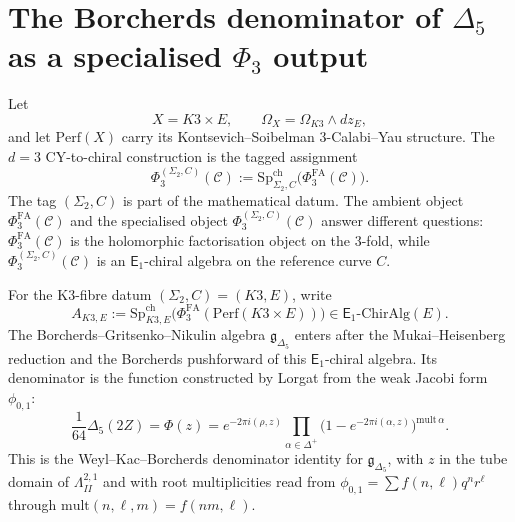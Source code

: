 \providecommand{\kBKM}{\kappa_{\mathrm{BKM}}}
\providecommand{\kch}{\kappa_{\mathrm{ch}}}
\providecommand{\kcat}{\kappa_{\mathrm{cat}}}
\providecommand{\kfib}{\kappa_{\mathrm{fiber}}}

\providecommand{\SpCh}{\mathrm{Sp}^{\mathrm{ch}}}
\providecommand{\PhiFA}{\Phi^{\mathrm{FA}}}
\providecommand{\Perf}{\mathrm{Perf}}
\providecommand{\HolFA}{\mathrm{HolFA}}
\providecommand{\ChirAlg}{\mathrm{ChirAlg}}
\providecommand{\CY}{\mathrm{CY}}
\providecommand{\HH}{\mathrm{HH}}
\providecommand{\CC}{\mathrm{CC}}
\providecommand{\CoHA}{\mathrm{CoHA}}
\providecommand{\Rep}{\mathrm{Rep}}
\providecommand{\cO}{\mathcal{O}}
\providecommand{\cZ}{\mathcal{Z}}
\providecommand{\cW}{\mathcal{W}}
\providecommand{\Eone}{\mathsf{E}_1}
\providecommand{\Etwo}{\mathsf{E}_2}
\providecommand{\Ethree}{\mathsf{E}_3}
\providecommand{\Ed}{\mathsf{E}_d}
\providecommand{\fg}{\mathfrak{g}}
\providecommand{\fgl}{\mathfrak{gl}}
\providecommand{\C}{\mathbb C}

\section*{The Borcherds denominator of \texorpdfstring{$\Delta_5$}{Delta5} as a
specialised \texorpdfstring{$\Phi_3$}{Phi3} output}
\label{sec:lorgat-two-stage-kapranov}

Let
\[
  X = K3\times E,\qquad
  \Omega_X = \Omega_{K3}\wedge dz_E,
\]
and let \(\Perf(X)\) carry its Kontsevich--Soibelman
\(3\)-Calabi--Yau structure.  The \(d=3\) CY-to-chiral construction is
the tagged assignment
\[
  \Phi_3^{(\Sigma_2,C)}(\mathcal C)
  :=
  \SpCh_{\Sigma_2,C}\bigl(\PhiFA_3(\mathcal C)\bigr).
\]
The tag \((\Sigma_2,C)\) is part of the mathematical datum.  The
ambient object \(\PhiFA_3(\mathcal C)\) and the specialised object
\(\Phi_3^{(\Sigma_2,C)}(\mathcal C)\) answer different questions:
\(\PhiFA_3(\mathcal C)\) is the holomorphic factorisation object on
the \(3\)-fold, while
\(\Phi_3^{(\Sigma_2,C)}(\mathcal C)\) is an \(\Eone\)-chiral algebra
on the reference curve \(C\).

For the K3-fibre datum \((\Sigma_2,C)=(K3,E)\), write
\[
  A_{K3,E}
  :=
  \SpCh_{K3,E}\bigl(\PhiFA_3(\Perf(K3\times E))\bigr)
  \in \Eone\text{-}\ChirAlg(E).
\]
The Borcherds--Gritsenko--Nikulin algebra \(\fg_{\Delta_5}\) enters
after the Mukai--Heisenberg reduction and the Borcherds pushforward of
this \(\Eone\)-chiral algebra.  Its denominator is the function
constructed by Lorgat from the weak Jacobi form \(\phi_{0,1}\):
\[
  \frac{1}{64}\Delta_5(2Z)
  =
  \Phi(z)
  =
  e^{-2\pi i(\rho,z)}
  \prod_{\alpha\in\Delta^+}
  \bigl(1-e^{-2\pi i(\alpha,z)}\bigr)^{\mathrm{mult}\,\alpha}.
\]
This is the Weyl--Kac--Borcherds denominator identity for
\(\fg_{\Delta_5}\), with \(z\) in the tube domain of
\(\Lambda^{2,1}_{II}\) and with root multiplicities read from
\(\phi_{0,1}=\sum f(n,\ell)q^n r^\ell\) through
\(\mathrm{mult}(n,\ell,m)=f(nm,\ell)\).


